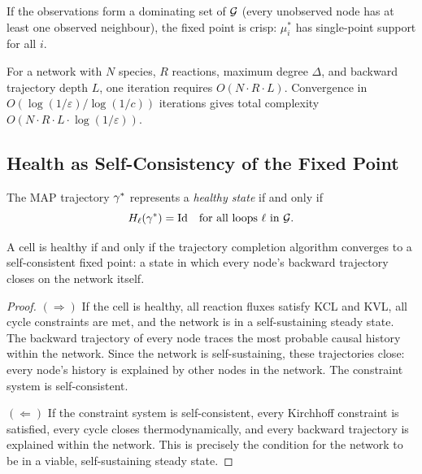 \begin{corollary}
\label{cor:crisp-convergence}
If the observations form a dominating set of $\mathcal{G}$ (every unobserved
node has at least one observed neighbour), the fixed point is crisp:
$\mu_i^{*}$ has single-point support for all $i$.
\end{corollary}

\begin{proposition}
\label{prop:complexity}
For a network with $N$ species, $R$ reactions, maximum degree $\Delta$,
and backward trajectory depth $L$, one iteration requires $O(N \cdot R \cdot L)$.
Convergence in $O(\log(1/\varepsilon)/\log(1/c))$ iterations gives total
complexity $O(N \cdot R \cdot L \cdot \log(1/\varepsilon))$.
\end{proposition}

\subsection{Health as Self-Consistency of the Fixed Point}

\begin{definition}
\label{def:self-consistent-health}
The MAP trajectory $\gamma^{*}$ represents a \emph{healthy state} if and
only if
\begin{equation}
  H_\ell(\gamma^{*}) = \mathrm{Id}
  \quad \text{for all loops } \ell \text{ in } \mathcal{G}.
  \label{eq:ch08-health-criterion}
\end{equation}
\end{definition}

\begin{theorem}
\label{thm:health-self-consistency}
A cell is healthy if and only if the trajectory completion algorithm
converges to a self-consistent fixed point: a state in which every node's
backward trajectory closes on the network itself.
\end{theorem}

\begin{proof}
$(\Rightarrow)$ If the cell is healthy, all reaction fluxes satisfy KCL
and KVL, all cycle constraints are met, and the network is in a
self-sustaining steady state.  The backward trajectory of every node
traces the most probable causal history within the network.  Since the
network is self-sustaining, these trajectories close: every node's history
is explained by other nodes in the network.  The constraint system is
self-consistent.

$(\Leftarrow)$ If the constraint system is self-consistent, every Kirchhoff
constraint is satisfied, every cycle closes thermodynamically, and every
backward trajectory is explained within the network.  This is precisely the
condition for the network to be in a viable, self-sustaining steady state.
\end{proof}

